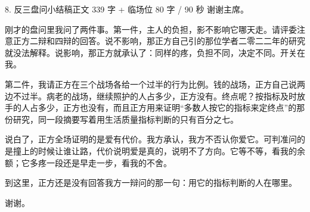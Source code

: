 \documentclass[script,con]{debate}
\begin{document}
\begin{speech}{8. 反三盘问小结稿}{正文 339 字 + 临场位 80 字 / 90 秒}
谢谢主席。

刚才的盘问里我问了两件事。第一件，主人的负担，影不影响它哪天走。请评委注意正方二辩和四辩的回答。说不影响，那正方自己引的那位学者二零二二年的研究就没法解释。说影响，那正方就承认了：同样的疼，负担不同，决定不同。开关在我。

第二件，我请正方在三个战场各给一个过半的行为比例。钱的战场，正方自己说两边不过半。病老的战场，继续照护的人占多少，正方没有。终点呢？按指标及时放手的人占多少，正方也没有，而且正方用来证明“多数人按它的指标来定终点”的那份研究，同一段摘要写着用生活质量指标判断的只有百分之七。

说白了，正方全场证明的是爱有代价。我方承认，我方不否认你爱它。可判准问的是撞上的时候让谁让路，代价说明爱是真的，说明不了方向。它等不等，看我的余额；它多疼一段还是早走一步，看我的不舍。

到这里，正方还是没有回答我方一辩问的那一句：用它的指标判断的人在哪里。

谢谢。
\end{speech}
\begin{contingency}
\end{contingency}
\end{document}
